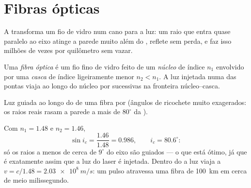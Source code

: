 \section{Fibras ópticas}

A  transforma um fio de vidro num cano para a luz: um raio
que entra quase paralelo ao eixo atinge a parede muito além do , reflete sem perda, e faz isso milhões de vezes por quilômetro sem
vazar.

\begin{definition}\label{def:g10:refraction:fiber}
Uma \emph{fibra óptica} é um fio fino de vidro feito
de um \emph{núcleo} de índice $n_1$ envolvido por uma
\emph{casca} de índice ligeiramente menor $n_2 < n_1$. A luz
injetada numa das pontas viaja ao longo do núcleo por 
sucessivas na fronteira núcleo--casca.
\end{definition}

\begin{omfigure}

{\small Luz guiada ao longo do  de uma fibra por 
(ângulos de ricochete muito exagerados: os raios reais rasam a parede a
mais de $80^\circ$ da ).}
\end{omfigure}

\begin{example}\label{ex:g10:refraction:fibernumbers}
Com $n_1 = 1.48$ e $n_2 = 1.46$,
\[
\sin i_c = \frac{1.46}{1.48} = 0.986,
\qquad i_c = 80.6^\circ :
\]
só os raios a menos de cerca de $9^\circ$ do eixo são guiados --- o que
está ótimo, já que é exatamente assim que a luz do laser é injetada.
Dentro do  a luz viaja a $v = c/1.48 = \qty{2.03e8}{m/s}$: um pulso
atravessa uma fibra de \qty{100}{km} em cerca de meio milissegundo.
\end{example}

